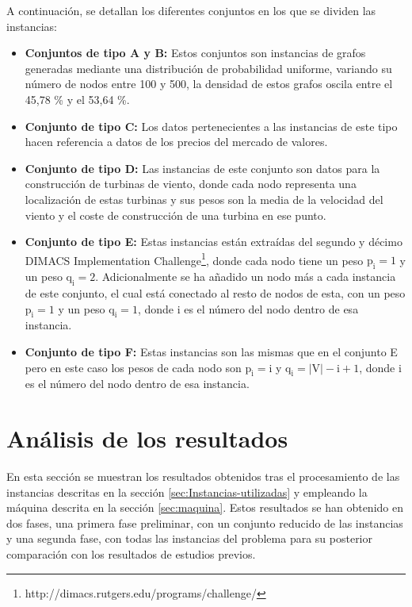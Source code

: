 A continuación, se detallan los diferentes conjuntos en los que se dividen las instancias:

\begin{itemize}
	
	\item \textbf{Conjuntos de tipo A y B:} Estos conjuntos son instancias de grafos generadas mediante una distribución de probabilidad uniforme, variando su número de nodos entre 100 y 500, la densidad de estos grafos oscila entre el 45,78 \% y el 53,64 \%.
	\item  \textbf{Conjunto de tipo C:} Los datos pertenecientes a las instancias de este tipo hacen referencia a datos de los precios del mercado de valores.
	\item  \textbf{Conjunto de tipo D:} Las instancias de este conjunto son datos para la construcción de turbinas de viento, donde cada nodo representa una localización de estas turbinas y sus pesos son la media de la velocidad del viento y el coste de construcción de una turbina en ese punto.
	\item  \textbf{Conjunto de tipo E:} Estas instancias están extraídas del segundo y décimo DIMACS Implementation Challenge\footnote{http://dimacs.rutgers.edu/programs/challenge/}, donde cada nodo tiene un peso $\mathrm{p_{i} = 1}$ y un peso $\mathrm{q_{i} = 2}$. Adicionalmente se ha añadido un nodo más a cada instancia de este conjunto, el cual está conectado al resto de nodos de esta, con un peso $\mathrm{p_{i} = 1}$ y un peso $\mathrm{q_{i} = 1}$, donde i es el número del nodo dentro de esa instancia.
	\item  \textbf{Conjunto de tipo F:} Estas instancias son las mismas que en el conjunto E pero en este caso los pesos de cada nodo son $\mathrm{p_{i} = i}$ y $\mathrm{q_{i} = |V| - i + 1}$, donde i es el número del nodo dentro de esa instancia.
	
	
\end{itemize}


\section{Análisis de los resultados}
En esta sección se muestran los resultados obtenidos tras el procesamiento de las instancias descritas en la sección \ref{sec:Instancias-utilizadas} y empleando la máquina descrita en la sección \ref{sec:maquina}. Estos resultados se han obtenido en dos fases, una primera fase preliminar, con un conjunto reducido de las instancias y una segunda fase, con todas las instancias del problema para su posterior comparación con los resultados de estudios previos.

